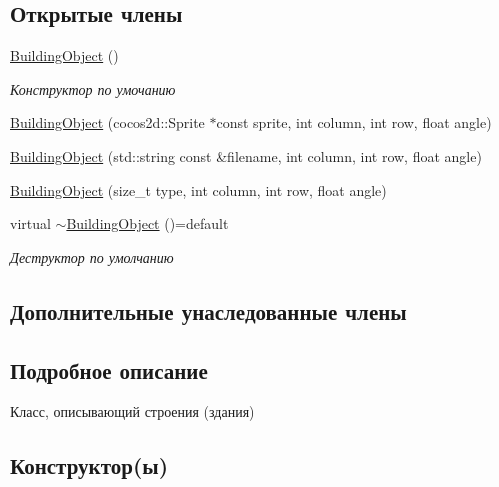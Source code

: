 \subsection*{Открытые члены}
\begin{DoxyCompactItemize}
\item 
\mbox{\label{classrtm_1_1_building_object_a03e7024f6e30929fd991bd811d6a7766}} 
\hyperlink{classrtm_1_1_building_object_a03e7024f6e30929fd991bd811d6a7766}{Building\+Object} ()
\begin{DoxyCompactList}\small\item\em Конструктор по умочанию \end{DoxyCompactList}\item 
\hyperlink{classrtm_1_1_building_object_a972c352ad972bec2381137299a95045c}{Building\+Object} (cocos2d\+::\+Sprite $\ast$const sprite, int column, int row, float angle)
\item 
\hyperlink{classrtm_1_1_building_object_a8507652023a31117c99593625011a456}{Building\+Object} (std\+::string const \&filename, int column, int row, float angle)
\item 
\hyperlink{classrtm_1_1_building_object_a3785e78d68f62e698013091d436e943d}{Building\+Object} (size\+\_\+t type, int column, int row, float angle)
\item 
\mbox{\label{classrtm_1_1_building_object_a6c339422b4b701fb1e3208ad4a9f737a}} 
virtual \hyperlink{classrtm_1_1_building_object_a6c339422b4b701fb1e3208ad4a9f737a}{$\sim$\+Building\+Object} ()=default
\begin{DoxyCompactList}\small\item\em Деструктор по умолчанию \end{DoxyCompactList}\end{DoxyCompactItemize}
\subsection*{Дополнительные унаследованные члены}


\subsection{Подробное описание}
Класс, описывающий строения (здания) 

\subsection{Конструктор(ы)}
\mbox{\label{classrtm_1_1_building_object_a972c352ad972bec2381137299a95045c}} 

